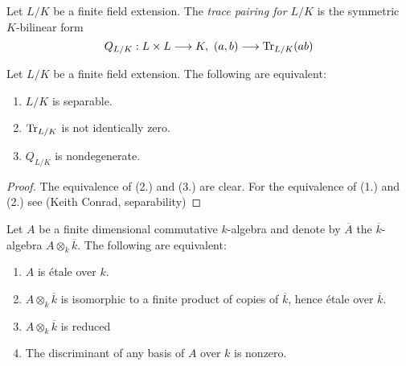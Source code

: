 \begin{definition}
  Let $L/K$ be a finite field extension. The \textit{trace pairing for $L/K$} is the symmetric $K$-bilinear form
  \[
    Q_{L/K} : L \times L \longrightarrow K,\ (a,b) \longrightarrow \operatorname{Tr}_{L/K}(ab)
  \]
\end{definition}

\begin{lemma}
  Let $L/K$ be a finite field extension. The following are equivalent:
  \begin{enumerate}
    \item $L/K$ is separable.
    \item $\operatorname{Tr}_{L/K}$ is not identically zero.
    \item $Q_{L/K}$ is nondegenerate.
  \end{enumerate}
\end{lemma}

\begin{proof}
  The equivalence of (2.) and (3.) are clear. 
  For the equivalence of (1.) and (2.) see (Keith Conrad, separability)
\end{proof}

\begin{theorem}
  Let $A$ be a finite dimensional commutative $k$-algebra and denote by $\overline{A}$ the $\overline{k}$-algebra $A \otimes_k \overline{k}$. The following are equivalent:
  \begin{enumerate}
    \item $A$ is \'etale over $k$.\label{etale}
    \item $A \otimes_k \overline{k}$ is isomorphic to a finite product of copies of $\overline{k}$, hence \'etale over $\overline{k}$.\label{product}
    \item $A \otimes_k \overline{k}$ is reduced
    \item The discriminant of any basis of $A$ over $k$ is nonzero.\label{trace}
  \end{enumerate}
\end{theorem}

